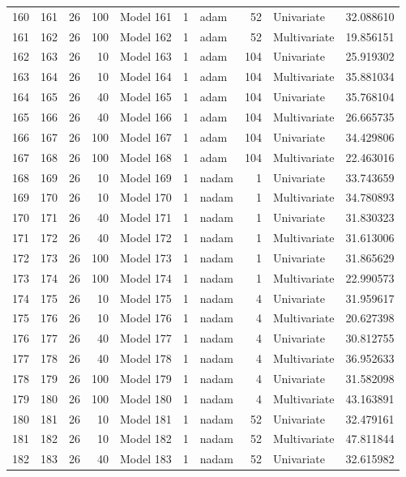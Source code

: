 \begin{tabular}{lrrrlrlrlr}
160 & 161 & 26 & 100 & Model 161 & 1 & adam & 52 & Univariate & 32.088610 \\
161 & 162 & 26 & 100 & Model 162 & 1 & adam & 52 & Multivariate & 19.856151 \\
162 & 163 & 26 & 10 & Model 163 & 1 & adam & 104 & Univariate & 25.919302 \\
163 & 164 & 26 & 10 & Model 164 & 1 & adam & 104 & Multivariate & 35.881034 \\
164 & 165 & 26 & 40 & Model 165 & 1 & adam & 104 & Univariate & 35.768104 \\
165 & 166 & 26 & 40 & Model 166 & 1 & adam & 104 & Multivariate & 26.665735 \\
166 & 167 & 26 & 100 & Model 167 & 1 & adam & 104 & Univariate & 34.429806 \\
167 & 168 & 26 & 100 & Model 168 & 1 & adam & 104 & Multivariate & 22.463016 \\
168 & 169 & 26 & 10 & Model 169 & 1 & nadam & 1 & Univariate & 33.743659 \\
169 & 170 & 26 & 10 & Model 170 & 1 & nadam & 1 & Multivariate & 34.780893 \\
170 & 171 & 26 & 40 & Model 171 & 1 & nadam & 1 & Univariate & 31.830323 \\
171 & 172 & 26 & 40 & Model 172 & 1 & nadam & 1 & Multivariate & 31.613006 \\
172 & 173 & 26 & 100 & Model 173 & 1 & nadam & 1 & Univariate & 31.865629 \\
173 & 174 & 26 & 100 & Model 174 & 1 & nadam & 1 & Multivariate & 22.990573 \\
174 & 175 & 26 & 10 & Model 175 & 1 & nadam & 4 & Univariate & 31.959617 \\
175 & 176 & 26 & 10 & Model 176 & 1 & nadam & 4 & Multivariate & 20.627398 \\
176 & 177 & 26 & 40 & Model 177 & 1 & nadam & 4 & Univariate & 30.812755 \\
177 & 178 & 26 & 40 & Model 178 & 1 & nadam & 4 & Multivariate & 36.952633 \\
178 & 179 & 26 & 100 & Model 179 & 1 & nadam & 4 & Univariate & 31.582098 \\
179 & 180 & 26 & 100 & Model 180 & 1 & nadam & 4 & Multivariate & 43.163891 \\
180 & 181 & 26 & 10 & Model 181 & 1 & nadam & 52 & Univariate & 32.479161 \\
181 & 182 & 26 & 10 & Model 182 & 1 & nadam & 52 & Multivariate & 47.811844 \\
182 & 183 & 26 & 40 & Model 183 & 1 & nadam & 52 & Univariate & 32.615982 \\

\end{tabular}
